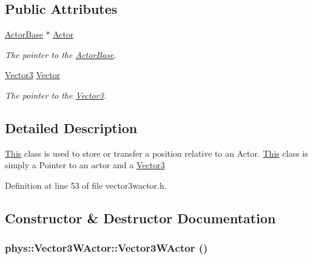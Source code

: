 \subsection*{Public Attributes}
\begin{DoxyCompactItemize}
\item 
\hypertarget{classphys_1_1Vector3WActor_ad9110e820da2e8eca9c3303cdc755938}{
\hyperlink{classphys_1_1ActorBase}{ActorBase} $\ast$ \hyperlink{classphys_1_1Vector3WActor_ad9110e820da2e8eca9c3303cdc755938}{Actor}}
\label{d2/de8/classphys_1_1Vector3WActor_ad9110e820da2e8eca9c3303cdc755938}

\begin{DoxyCompactList}\small\item\em The pointer to the \hyperlink{classphys_1_1ActorBase}{ActorBase}. \item\end{DoxyCompactList}\item 
\hypertarget{classphys_1_1Vector3WActor_ab8e056d80d61d3685af8db1da82a73ae}{
\hyperlink{classphys_1_1Vector3}{Vector3} \hyperlink{classphys_1_1Vector3WActor_ab8e056d80d61d3685af8db1da82a73ae}{Vector}}
\label{d2/de8/classphys_1_1Vector3WActor_ab8e056d80d61d3685af8db1da82a73ae}

\begin{DoxyCompactList}\small\item\em The pointer to the \hyperlink{classphys_1_1Vector3}{Vector3}. \item\end{DoxyCompactList}\end{DoxyCompactItemize}


\subsection{Detailed Description}
\hyperlink{structThis}{This} class is used to store or transfer a position relative to an Actor. \hyperlink{structThis}{This} class is simply a Pointer to an actor and a \hyperlink{classphys_1_1Vector3}{Vector3} 

Definition at line 53 of file vector3wactor.h.



\subsection{Constructor \& Destructor Documentation}
\hypertarget{classphys_1_1Vector3WActor_a910f3ee25e7f654e7ba3bedb9942c8f7}{
\subsubsection[{Vector3WActor}]{\setlength{\rightskip}{0pt plus 5cm}phys::Vector3WActor::Vector3WActor ()}}
\label{d2/de8/classphys_1_1Vector3WActor_a910f3ee25e7f654e7ba3bedb9942c8f7}



